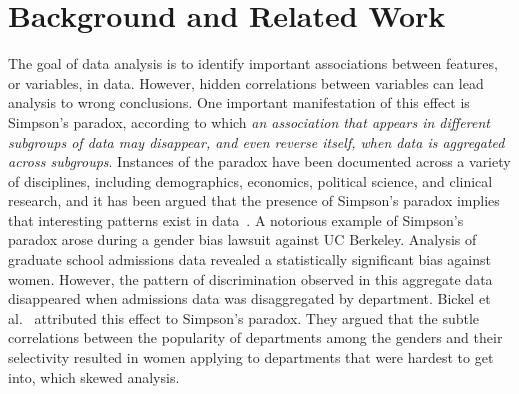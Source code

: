 \section{Background and Related Work}
\label{sec:related}
%
%
%
%
%

%
%
%

The goal of data analysis is to identify important associations between features, or variables, in data. %
However, hidden correlations between variables can lead analysis to wrong conclusions. One important manifestation of this effect is Simpson's paradox, according to which \emph{an association that appears in different subgroups of data may disappear, and even reverse itself, when data is aggregated across subgroups}.
Instances of the paradox have been documented across a variety of disciplines, including demographics, economics, political science, and clinical research, and it has been argued that the presence of Simpson's paradox implies that interesting patterns exist in data~\cite{fabris2000discovering}.
A notorious example of Simpson's paradox  arose during a gender bias lawsuit against UC Berkeley. Analysis of graduate school admissions data revealed a statistically significant bias against women. %
However, the pattern of discrimination observed in this aggregate data disappeared when admissions data was disaggregated by department.
Bickel et al.~\cite{Bickel1975} attributed this effect to Simpson's paradox. They argued that the subtle correlations between the popularity of departments among the genders and their selectivity resulted in women applying to departments that were hardest to get into, which skewed analysis.

